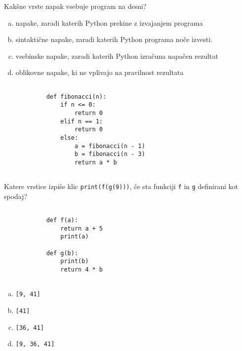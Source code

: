 \documentclass[arhiv, 10pt]{../izpit}
\newcommand{\inlinepy}[1]{\texttt{#1}}
\begin{document}
        \naloga*
        \begin{multicols}{2}
        \noindent
        Kakšne vrste napak vsebuje program na desni?

        \begin{enumerate}[(a)]
\item napake, zaradi katerih Python prekine z izvajanjem programa
\item sintaktične napake, zaradi katerih Python programa noče izvesti.
\item vsebinske napake, zaradi katerih Python izračuna napačen rezultat
\item oblikovne napake, ki ne vplivajo na pravilnost rezultata
\end{enumerate}

        \columnbreak

        \begin{verbatim}
        
            def fibonacci(n):
                if n <= 0:
                    return 0
                elif n == 1:
                    return 0
                else:
                    a = fibonacci(n - 1)
                    b = fibonacci(n - 3)
                    return a * b
            
        \end{verbatim}

        \end{multicols}

    
        \naloga*
        Katere vrstice izpiše klic \inlinepy{print(f(g(9)))}, če sta funkciji \inlinepy{f} in \inlinepy{g} definirani kot spodaj?

        \begin{multicols}{2}
        \begin{verbatim}
        
            def f(a):
                return a + 5
                print(a)

            def g(b):
                print(b)
                return 4 * b
        
        \end{verbatim}

        \begin{enumerate}[(a)]
\item \inlinepy{[9, 41]}
\item \inlinepy{[41]}
\item \inlinepy{[36, 41]}
\item \inlinepy{[9, 36, 41]}
\end{enumerate}

        \end{multicols}
    
\end{document}
